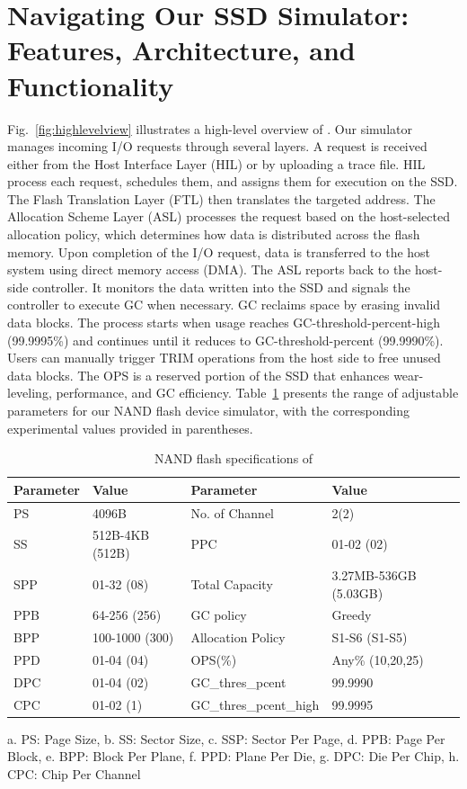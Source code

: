 \documentclass{ieeeaccess}
\begin{document}
\section{Navigating Our SSD Simulator: Features, Architecture, and Functionality}
\label{subsec:navigating_our_ssd_simulator}

Fig.~\ref{fig:highlevelview} illustrates a high-level overview of \eyanassdsim. Our simulator manages incoming I/O requests through several layers.
 A request is received either from the Host Interface Layer (HIL) or by uploading a trace file. HIL process each request, schedules them, and assigns them for execution on the SSD. The Flash Translation Layer (FTL) then translates the targeted address. The Allocation Scheme Layer (ASL) processes the request based on the host-selected allocation policy, which determines how data is distributed across the flash memory. Upon completion of the I/O request, data is transferred to the host system using direct memory access (DMA). The ASL reports back to the host-side controller. It monitors the data written into the SSD and signals the controller to execute GC when necessary. GC reclaims space by erasing invalid data blocks. The process starts when usage reaches GC-threshold-percent-high (99.9995\%) and continues until it reduces to GC-threshold-percent (99.9990\%). Users can manually trigger TRIM operations from the host side to free unused data blocks. The OPS is a reserved portion of the SSD that enhances wear-leveling, performance, and GC efficiency. 
Table~\ref{table:devicespecification} presents the range of adjustable parameters for our NAND flash device simulator, with the corresponding experimental values provided in parentheses.

\begin{table}
 \centering
 \caption{NAND flash specifications of \eyanassdsim}
 \label{table:devicespecification}
 \begin{tabular}{|p{1.2cm}|p{1.8cm}|p{2.3cm}|p{1.8cm}|}

 \hline
 Parameter & Value & Parameter & Value \\
 \hline
 PS & 4096B & No. of Channel & 2(2)\\
 \hline
 SS & 512B-4KB (512B) & PPC & 01-02 (02)\\
 \hline
 SPP & 01-32 (08) & Total Capacity & 3.27MB-536GB (5.03GB)\\
 \hline
 PPB & 64-256 (256) & GC policy & Greedy \\
 \hline
 BPP & 100-1000 (300) & Allocation Policy & S1-S6 (S1-S5)\\
 \hline
 PPD & 01-04 (04) & OPS(\%)& Any\% (10,20,25)\\
 \hline
 DPC & 01-04 (02) & GC\_thres\_pcent & 99.9990\\
 \hline
 CPC & 01-02 (1) & GC\_thres\_pcent\_high & 99.9995\\
 \hline

 \end{tabular}
 a. PS: Page Size,
 b. SS: Sector Size,
 c. SSP: Sector Per Page,
 d. PPB: Page Per Block,
 e. BPP: Block Per Plane,
 f. PPD: Plane Per Die,
 g. DPC: Die Per Chip,
 h. CPC: Chip Per Channel
\end{table}
\end{document}
